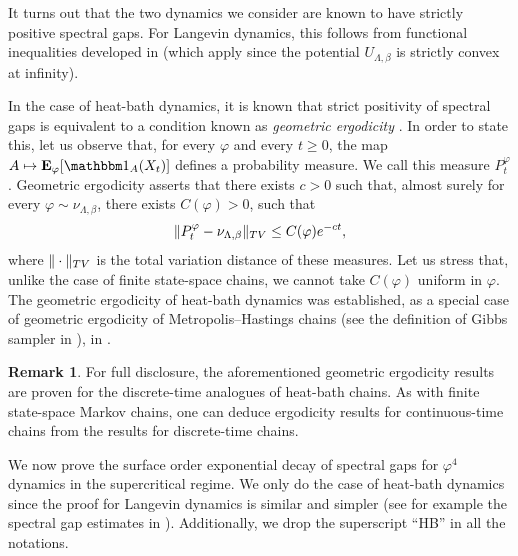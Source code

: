 \documentclass[11pt,a4paper]{article}
\theoremstyle{definition}
\newtheorem{remark}[theorem]{Remark}
\numberwithin{equation}{section}
\begin{document}
It turns out that the two dynamics we consider are known to have strictly positive spectral gaps. For Langevin dynamics, this follows from functional inequalities developed in \cite{ledoux2001logarithmic} (which apply since the potential $U_{\Lambda,\beta}$ is strictly convex at infinity). 

In the case of heat-bath dynamics, it is known that strict positivity of spectral gaps is equivalent to a condition known as \emph{geometric ergodicity} \cite{roberts2001geometric}. In order to state this, let us observe that, for every $\varphi$ and every $t\geq 0$, the map $A \mapsto \mathbf E_\varphi[\mathbbm 1_A(X_t)]$ defines a probability measure. We call this measure $P_t^\varphi$. Geometric ergodicity asserts that there exists $c>0$ such that, almost surely for every $\varphi \sim \nu_{\Lambda,\beta}$, there exists $C(\varphi)>0$, such that
\begin{equation}
\| P_t^\varphi - \nu_{\Lambda,\beta} \|_{{\rm TV}} \leq C(\varphi) e^{-c t},
\end{equation}
where $\|\cdot\|_{{\rm TV}}$ is the total variation distance of these measures. Let us stress that, unlike the case of finite state-space chains, we cannot take $C(\varphi)$ uniform in $\varphi$. The geometric ergodicity of heat-bath dynamics was established, as a special case of geometric ergodicity of Metropolis--Hastings chains (see the definition of Gibbs sampler in \cite{RR04}), in \cite{RT96b}.

\begin{remark}
For full disclosure, the aforementioned geometric ergodicity results are proven for the discrete-time analogues of heat-bath chains. As with finite state-space Markov chains, one can deduce ergodicity results for continuous-time chains from the results for discrete-time chains.
\end{remark}

We now prove the surface order exponential decay of spectral gaps for $\varphi^4$ dynamics in the supercritical regime. We only do the case of heat-bath dynamics since the proof for Langevin dynamics is similar and simpler (see for example the spectral gap estimates in \cite{CGW22}). Additionally, we drop the superscript ``HB'' in all the notations. 
\end{document}
